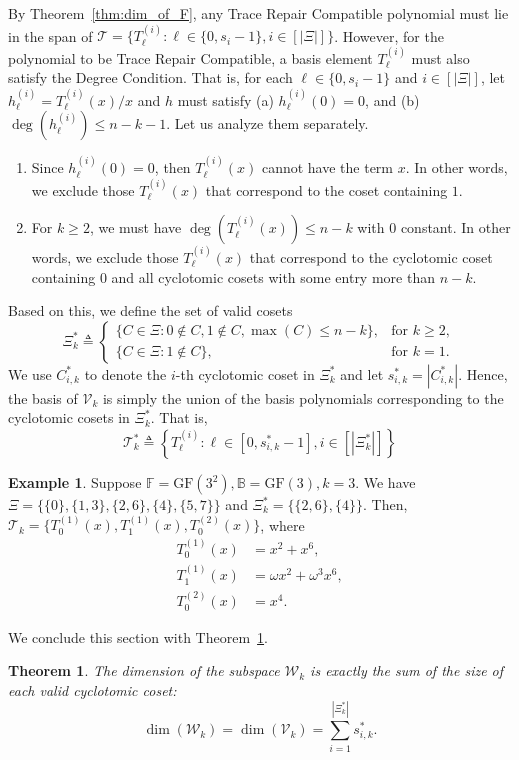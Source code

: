 \documentclass[onecolumn]{IEEEtran}
\theoremstyle{plain}
\newtheorem{theorem}{Theorem}
\theoremstyle{definition}
\newtheorem{example}[definition]{Example}
\newcommand{\FF}{\mathbb{F}}
\newcommand{\BB}{\mathbb{B}}
\newcommand{\GF}{{\mathrm{GF}}}
\newcommand{\cT}{\mathcal{T}}
\newcommand{\cW}{\mathcal{W}}
\newcommand{\cV}{\mathcal{V}}
\begin{document}
By Theorem~\ref{thm:dim_of_F}, any Trace Repair Compatible polynomial must lie in the span of $\cT = \{T_{\ell}^{(i)}:\ell\in\{0,s_i-1\},i\in[|\Xi|]\}$. However, for the polynomial to be Trace Repair Compatible, a basis element $T_{\ell}^{(i)}$ must also satisfy the Degree Condition. That is, for each $\ell\in\{0,s_i-1\}$ and $i\in[|\Xi|]$, let $h_{\ell}^{(i)} = T_{\ell}^{(i)}(x)/x$ and $h$ must satisfy (a) $h_\ell^{(i)}(0) = 0$, and (b) $\deg(h_\ell^{(i)})\le n-k-1$. Let us analyze them separately.
\begin{enumerate}[label = (\alph*)]
    \item Since $h_\ell^{(i)}(0) = 0$, then $T_{\ell}^{(i)}(x)$ cannot have the term $x$. In other words, we exclude those $T_{\ell}^{(i)}(x)$ that correspond to the coset containing $1$.
    \item For $k\ge 2$, we must have $\deg(T_\ell^{(i)}(x)) \le n-k$ with $0$ constant. In other words, we exclude those $T_\ell^{(i)}(x)$ that correspond to the cyclotomic coset containing $0$ and all cyclotomic cosets with some entry more than $n-k$.
\end{enumerate}
Based on this, we define the set of valid cosets 
$$\Xi_{k}^* \triangleq\begin{cases}
    \{C\in \Xi: 0\notin C, 1\notin C, \max(C)\le n-k\},&\text{for }k\ge 2,\\
    \{C\in \Xi: 1\notin C\},&\text{for }k= 1.
\end{cases} $$
We use $C_{i,k}^*$ to denote the $i$-th cyclotomic coset in $\Xi_k^*$ and let $s_{i,k}^* = |C_{i,k}^*|$. Hence, the basis of $\cV_k$ is simply the union of the basis polynomials corresponding to the cyclotomic cosets in $\Xi_k^*$. That is, 
$$
\cT_k^{*} \triangleq \left\{T_{\ell}^{(i)}:\ell\in[0,s_{i,k}^*-1], i\in[|\Xi_k^*|]\right\}
$$
\begin{example}
    Suppose $\FF = \GF(3^2),\BB = \GF(3),k=3$. We have $\Xi =\{\{0\},\{1,3\},\{2,6\},\{4\},\{5,7\}\}$ and $\Xi^*_k = \{\{2,6\},\{4\}\}$. Then, $\cT_k = \{T_0^{(1)}(x), T_1^{(1)}(x), T_0^{(2)}(x)\}$, where
    \begin{align*}
        T_0^{(1)}(x) &= x^2 + x^6,\\
        T_1^{(1)}(x) &= \omega x^2 + \omega^3 x^6,\\
        T_0^{(2)}(x) &= x^4.
    \end{align*}
\end{example}
\noindent We conclude this section with Theorem~\ref{thm:dim_of_Wk}.

\begin{theorem}\label{thm:dim_of_Wk}
    The dimension of the subspace $\cW_k$ is exactly the sum of the size of each valid cyclotomic coset:
    $$
    \dim(\cW_k) = \dim(\cV_k) = \sum_{i=1}^{|\Xi_k^*|} s_{i,k}^*.
    $$
\end{theorem}
\end{document}
